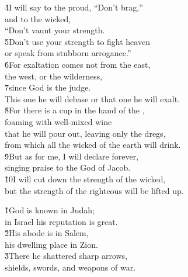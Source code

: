 \begin{poetry}
\poeml \v{4}I will say to the proud, ``Don't brag,'' \\
\poemll    and to the wicked, \\
\poemlll       ``Don't vaunt your strength. \\
\poeml \v{5}Don't use your strength to fight heaven \\
\poemll    or speak from stubborn arrogance.'' \\
\poeml \v{6}For exaltation comes not from the east, \\
\poemll    the west, or the wilderness, \\
\poeml \v{7}since God is the judge. \\
\poemll    This one he will debase or that one he will exalt. \\
\poeml \v{8}For there is a cup in the hand of the , \\
\poemll    foaming with well-mixed wine \\
\poeml that he will pour out, leaving only the dregs, \\
\poemll    from which all the wicked of the earth will drink. \\
\poeml \v{9}But as for me, I will declare forever, \\
\poemll    singing praise to the God of Jacob. \\
\poeml \v{10}I will cut down the strength of the wicked, \\
\poemll    but the strength of the righteous will be lifted up.
\end{poetry}

\begin{poetry}
\poeml \v{1}God is known in Judah; \\
\poemll    in Israel his reputation is great. \\
\poeml \v{2}His abode is in Salem, \\
\poemll    his dwelling place in Zion. \\
\poeml \v{3}There he shattered sharp arrows, \\
\poemll    shields, swords, and weapons of war.
\end{poetry}

